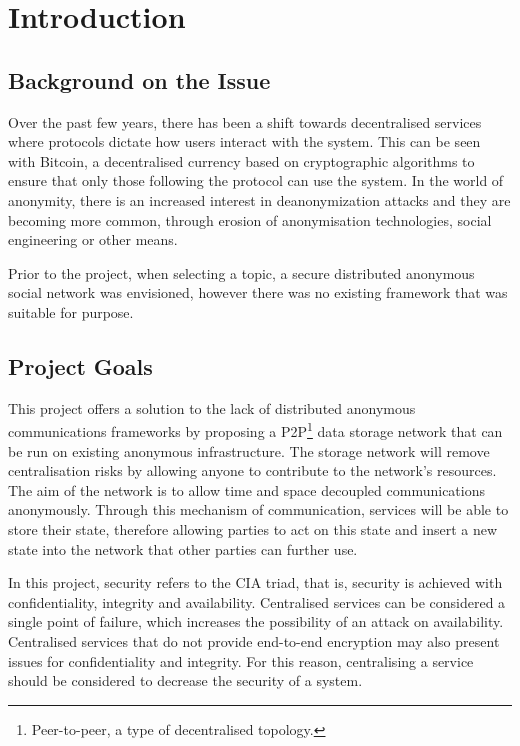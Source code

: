 \section{Introduction}
	\subsection{Background on the Issue}
	Over the past few years, there has been a shift towards decentralised services where protocols dictate how users interact with the system. This can be seen with Bitcoin, a decentralised currency based on cryptographic algorithms to ensure that only those following the protocol can use the system. In the world of anonymity, there is an increased interest in deanonymization attacks and they are becoming more common, through erosion of anonymisation technologies, social engineering or other means.
	
	Prior to the project, when selecting a topic, a secure distributed anonymous social network was envisioned, however there was no existing framework that was suitable for purpose. 
	
	
	\subsection{Project Goals}
	
	This project offers a solution to the lack of distributed anonymous communications frameworks by proposing a P2P\footnote{Peer-to-peer, a type of decentralised topology.} data storage network that can be run on existing anonymous infrastructure. The storage network will remove centralisation risks by allowing anyone to contribute to the network's resources. The aim of the network is to allow time and space decoupled communications anonymously. Through this mechanism of communication, services will be able to store their state, therefore allowing parties to act on this state and insert a new state into the network that other parties can further use.
	
	In this project, security refers to the CIA triad, that is, security is achieved with confidentiality, integrity and availability. Centralised services can be considered a single point of failure, which increases the possibility of an attack on availability. Centralised services that do not provide end-to-end encryption may also present issues for confidentiality and integrity. For this reason, centralising a service should be considered to decrease the security of a system.
	
